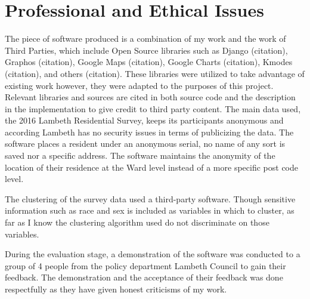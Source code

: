 \chapter{Professional and Ethical Issues}

The piece of software produced is a combination of my work and the work of Third Parties, which include Open Source libraries such as Django (citation), Graphos (citation), Google Maps (citation), Google Charts (citation), Kmodes (citation), and others (citation). These libraries were utilized to take advantage of existing work however, they were adapted to the purposes of this project. Relevant libraries and sources are cited in both source code and the description in the implementation to give credit to third party content.
The main data used, the 2016 Lambeth Residential Survey, keeps its participants anonymous and according Lambeth has no security issues in terms of publicizing the data. The software places a resident under an anonymous serial, no name of any sort is saved nor a specific address. The software maintains the anonymity of the location of their residence at the Ward level instead of a more specific post code level.\par

The clustering of the survey data used a third-party software. Though sensitive information such as race and sex is included as variables in which to cluster, as far as I know the clustering algorithm used do not discriminate on those variables. \par

During the evaluation stage, a demonstration of the software was conducted to a group of 4 people from the policy department Lambeth Council to gain their feedback. The demonstration and the acceptance of their feedback was done respectfully as they have given honest criticisms of my work. \par
